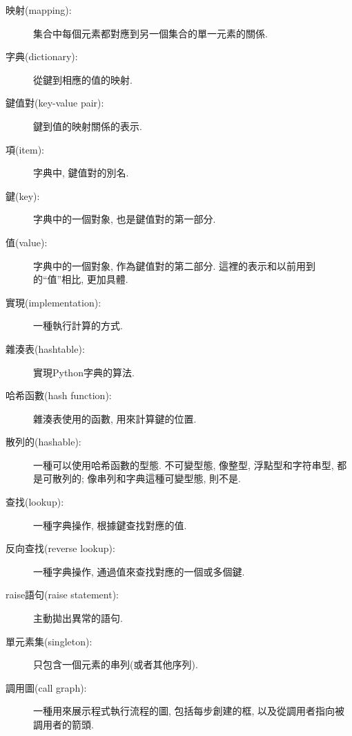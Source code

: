 \documentclass[10pt]{book}
\begin{document}
\begin{description}

\item[映射(mapping):] 集合中每個元素都對應到另一個集合的單一元素的關係.

\item[字典(dictionary):] 從鍵到相應的值的映射. 

\item[鍵值對(key-value pair):] 鍵到值的映射關係的表示. 

\item[項(item):] 字典中, 鍵值對的別名. 

\item[鍵(key):] 字典中的一個對象, 也是鍵值對的第一部分. 

\item[值(value):] 字典中的一個對象, 作為鍵值對的第二部分. 
這裡的表示和以前用到的``值''相比, 更加具體. 

\item[實現(implementation):] 一種執行計算的方式. 

\item[雜湊表(hashtable):] 實現Python字典的算法. 

\item[哈希函數(hash function):] 雜湊表使用的函數, 用來計算鍵的位置. 

\item[散列的(hashable):] 一種可以使用哈希函數的型態. 
不可變型態, 像整型, 浮點型和字符串型, 都是可散列的;
像串列和字典這種可變型態, 則不是. 

\item[查找(lookup):] 一種字典操作, 根據鍵查找對應的值.

\item[反向查找(reverse lookup):] 一種字典操作, 通過值來查找對應的一個或多個鍵.

\item[raise語句(raise statement):]  主動拋出異常的語句.

\item[單元素集(singleton):] 只包含一個元素的串列(或者其他序列).

\item[調用圖(call graph):] 一種用來展示程式執行流程的圖, 包括每步創建的框, 
以及從調用者指向被調用者的箭頭. 


\end{description}
\end{document}

